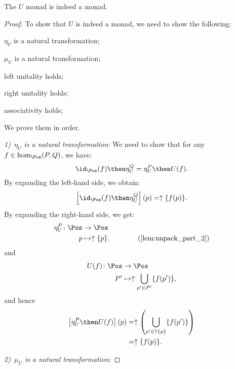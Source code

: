 \begin{lemma}
    The $U$ monad is indeed a monad.
\end{lemma}
\begin{proof}
    To show that $U$ is indeed a monad, we need to show the following:
    \begin{compactenum}
        \item $\eta_U$ is a natural transformation;
        \item $\mu_U$ is a natural transformation;
        \item left unitality holds;
        \item right unitality holds;
        \item associativity holds;
    \end{compactenum}
    We prove them in order.

    \emph{1)~$\eta_U$ is a natural transformation}: We need to show that for any~$f\in \hom_{\Pos}(P,Q)$, we have:
    \begin{equation}
        \id_{\Pos}(f)\then \eta_{U}^Q=\eta_{U}^P\then U(f).
    \end{equation}
    By expanding the left-hand side, we obtain:
    \begin{equation}
        \left[\id_{\Pos}(f)\then \eta_{U}^Q\right](p)=\uparrow \{f(p)\}.
    \end{equation}
    By expanding the right-hand side, we get:
    \begin{equation}
        \begin{aligned}
            \eta_{U}^P\colon \Pos &\to \Pos\\
            p&\mapsto \uparrow \{p\}. \qquad \qquad (\cref{lem:unpack_part_2})
        \end{aligned}
    \end{equation}
    and
    \begin{equation}
        \begin{aligned}
            U(f)\colon \Pos &\to \Pos\\
            P'&\mapsto \uparrow \bigcup_{p'\in P'}\{f(p')\},
        \end{aligned}
    \end{equation}
    and hence
    \begin{equation}
        \begin{aligned}
            \left[\eta_{U}^P\then U(f)\right](p)&=\uparrow \left( \bigcup_{p'\in \uparrow \{p\}} \{f(p')\}\right)\\
            &=\uparrow \{f(p)\}.
        \end{aligned}
    \end{equation}

    \emph{2)~$\mu_U$ is a natural transformation}:
\end{proof}
